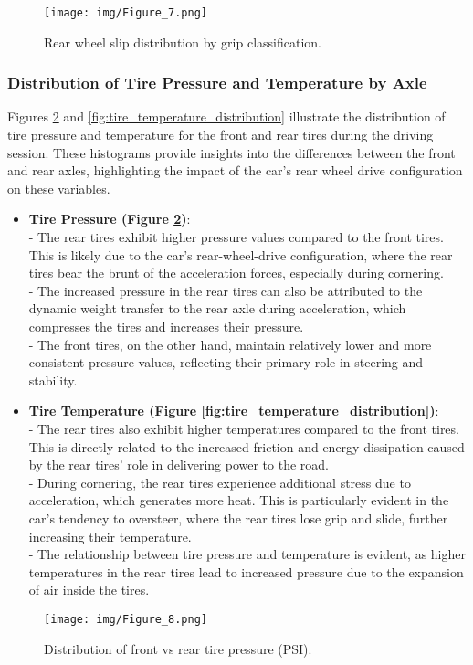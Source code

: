 \documentclass[a4paper,final,12pt]{report}
\begin{document}
\begin{figure}[H]
    \centering
    \texttt{[image: img/Figure\_7.png]}
    \caption{Rear wheel slip distribution by grip classification.}
    \label{fig:rear_slip_classification}
\end{figure}

\subsubsection{Distribution of Tire Pressure and Temperature by Axle}
Figures \ref{fig:tire_pressure_distribution} and \ref{fig:tire_temperature_distribution} illustrate the distribution of tire pressure and temperature for the front and rear tires during the driving session. These histograms provide insights into the differences between the front and rear axles, highlighting the impact of the car's rear wheel drive configuration on these variables.

\begin{itemize}
    \item \textbf{Tire Pressure (Figure \ref{fig:tire_pressure_distribution})}:\\
    - The rear tires exhibit higher pressure values compared to the front tires. This is likely due to the car's rear-wheel-drive configuration, where the rear tires bear the brunt of the acceleration forces, especially during cornering.\\
    - The increased pressure in the rear tires can also be attributed to the dynamic weight transfer to the rear axle during acceleration, which compresses the tires and increases their pressure.\\
    - The front tires, on the other hand, maintain relatively lower and more consistent pressure values, reflecting their primary role in steering and stability.

    \item \textbf{Tire Temperature (Figure \ref{fig:tire_temperature_distribution})}:\\
    - The rear tires also exhibit higher temperatures compared to the front tires. This is directly related to the increased friction and energy dissipation caused by the rear tires' role in delivering power to the road.\\
    - During cornering, the rear tires experience additional stress due to acceleration, which generates more heat. This is particularly evident in the car's tendency to oversteer, where the rear tires lose grip and slide, further increasing their temperature.\\
    - The relationship between tire pressure and temperature is evident, as higher temperatures in the rear tires lead to increased pressure due to the expansion of air inside the tires.
\end{itemize}
\begin{figure}[H]
    \centering
    \texttt{[image: img/Figure\_8.png]}
    \caption{Distribution of front vs rear tire pressure (PSI).}
    \label{fig:tire_pressure_distribution}
\end{figure}
\end{document}
